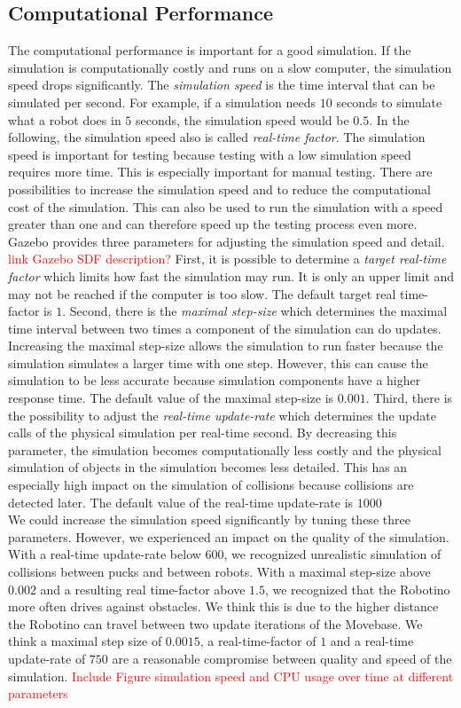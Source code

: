 \subsection{Computational Performance}
The computational performance is important for a good simulation. If the simulation is computationally costly and runs on a slow computer, the simulation speed drops significantly. The \textit{simulation speed} is the time interval that can be simulated per second. For example, if a simulation needs $10$ seconds to simulate what a robot does in $5$ seconds, the simulation speed would be $0.5$. In the following, the simulation speed also is called \textit{real-time factor}. The simulation speed is important for testing because testing with a low simulation speed requires more time. This is especially important for manual testing. There are possibilities to increase the simulation speed and to reduce the computational cost of the simulation. This can also be used to run the simulation with a speed greater than one and can therefore speed up the testing process even more. Gazebo provides three parameters for adjusting the simulation speed and detail. \textcolor{red}{link Gazebo SDF description?} First, it is possible to determine a \textit{target real-time factor} which limits how fast the simulation may run. It is only an upper limit and may not be reached if the computer is too slow. The default target real time-factor is $1$. Second, there is the \textit{maximal step-size} which determines the maximal time interval between two times a component of the simulation can do updates. Increasing the maximal step-size allows the simulation to run faster because the simulation simulates a larger time with one step. However, this can cause the simulation to be less accurate because simulation components have a higher response time. The default value of the maximal step-size is $0.001$. Third, there is the possibility to adjust the \textit{real-time update-rate} which determines the update calls of the  physical simulation per real-time second. By decreasing this parameter, the simulation becomes computationally less costly and the physical simulation of objects in the simulation becomes less detailed. This has an especially high impact on the simulation of collisions because collisions are detected later. The default value of the real-time update-rate is $1000$\\
We could increase the simulation speed significantly by tuning these three parameters. However, we experienced an impact on the quality of the simulation. With a real-time update-rate below $600$, we recognized unrealistic simulation of collisions between pucks and between robots. With a maximal step-size above $0.002$ and a resulting real time-factor above $1.5$, we recognized that the Robotino more often drives against obstacles. We think this is due to the higher distance the Robotino can travel between two update iterations of the Movebase. We think a maximal step size of $0.0015$, a real-time-factor of $1$ and a real-time update-rate of $750$ are a reasonable compromise between quality and speed of the simulation. \textcolor{red}{Include Figure simulation speed and CPU usage over time at different parameters}\\
